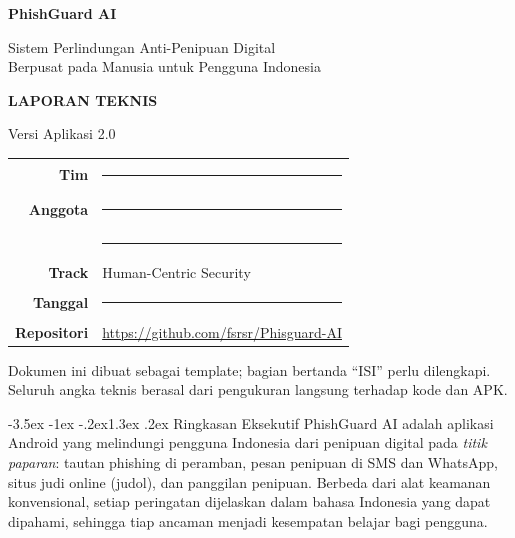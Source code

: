 \documentclass[11pt,a4paper]{article}
\makeatletter
\renewcommand\section{\@startsection{section}{1}{\z@}%
  {-3.5ex \@plus -1ex \@minus -.2ex}{1.3ex \@plus.2ex}%
  {\normalfont\Large\bfseries\color{navy}}}
\makeatother
\begin{document}
\begin{titlepage}
  \centering
  \vspace*{2cm}


  {\Huge\bfseries\color{navy} PhishGuard AI\par}
  \vspace{0.4cm}
  {\Large\color{slate} Sistem Perlindungan Anti-Penipuan Digital\\
   Berpusat pada Manusia untuk Pengguna Indonesia\par}
  \vspace{2cm}

  {\large\bfseries LAPORAN TEKNIS\par}
  \vspace{0.3cm}
  {\color{slate} Versi Aplikasi 2.0\par}
  \vspace{3cm}

  \begin{tabular}{rl}
    \textbf{Tim} & \rule{5cm}{0.4pt} \\[4pt]         %
    \textbf{Anggota} & \rule{5cm}{0.4pt} \\[4pt]     %
                     & \rule{5cm}{0.4pt} \\[4pt]     %
    \textbf{Track} & Human-Centric Security \\[4pt]
    \textbf{Tanggal} & \rule{5cm}{0.4pt} \\[4pt]     %
    \textbf{Repositori} & \url{https://github.com/fsrsr/Phisguard-AI} \\
  \end{tabular}

  \vfill
  {\small\color{slate} Dokumen ini dibuat sebagai template; bagian bertanda
  ``ISI'' perlu dilengkapi. Seluruh angka teknis berasal dari pengukuran
  langsung terhadap kode dan APK.\par}
\end{titlepage}

\tableofcontents
\newpage

\section{Ringkasan Eksekutif}
PhishGuard AI adalah aplikasi Android yang melindungi pengguna Indonesia
dari penipuan digital pada \emph{titik paparan}: tautan phishing di
peramban, pesan penipuan di SMS dan WhatsApp, situs judi online (judol),
dan panggilan penipuan. Berbeda dari alat keamanan konvensional, setiap
peringatan dijelaskan dalam bahasa Indonesia yang dapat dipahami, sehingga
tiap ancaman menjadi kesempatan belajar bagi pengguna.
\end{document}
